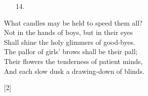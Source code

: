 \documentclass{article}
\begin{document}
\begin{multicols}{2}

    \begin{turn}{90}
        \begin{minipage}{1cm}
            \begin{enumerate}[itemsep=1ex]
                \item[] 
                \item[] 
                \item[14.] 
            \end{enumerate}
        \end{minipage}

        \begin{minipage}{7cm}
                What candles may be held to speed them all?\\
                Not in the hands of boys, but in their eyes\\
                Shall shine the holy glimmers of good-byes.\\
                The pallor of girls' brows shall be their pall;\\
                Their flowers the tenderness of patient minds,\\
                And each slow dusk a drawing-down of blinds.\\

                \begin{center}[2]\end{center}
                
        \end{minipage}
    \end{turn}
\end{multicols}
\end{document}
